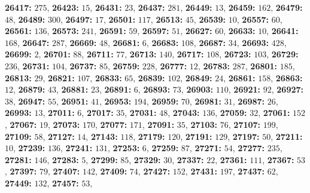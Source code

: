 \textsf{\bfseries 26417:} $275$, \textsf{\bfseries 26423:} $15$, \textsf{\bfseries 26431:} $23$, \textsf{\bfseries 26437:} $281$, \textsf{\bfseries 26449:} $13$, \textsf{\bfseries 26459:} $162$, \textsf{\bfseries 26479:} $48$, \textsf{\bfseries 26489:} $300$, \textsf{\bfseries 26497:} $17$, \textsf{\bfseries 26501:} $117$, \textsf{\bfseries 26513:} $45$, \textsf{\bfseries 26539:} $10$, \textsf{\bfseries 26557:} $60$, \textsf{\bfseries 26561:} $136$, \textsf{\bfseries 26573:} $241$, \textsf{\bfseries 26591:} $59$, \textsf{\bfseries 26597:} $51$, \textsf{\bfseries 26627:} $60$, \textsf{\bfseries 26633:} $10$, \textsf{\bfseries 26641:} $168$, \textsf{\bfseries 26647:} $287$, \textsf{\bfseries 26669:} $48$, \textsf{\bfseries 26681:} $6$, \textsf{\bfseries 26683:} $108$, \textsf{\bfseries 26687:} $34$, \textsf{\bfseries 26693:} $428$, \textsf{\bfseries 26699:} $2$, \textsf{\bfseries 26701:} $88$, \textsf{\bfseries 26711:} $77$, \textsf{\bfseries 26713:} $140$, \textsf{\bfseries 26717:} $108$, \textsf{\bfseries 26723:} $103$, \textsf{\bfseries 26729:} $236$, \textsf{\bfseries 26731:} $104$, \textsf{\bfseries 26737:} $85$, \textsf{\bfseries 26759:} $228$, \textsf{\bfseries 26777:} $12$, \textsf{\bfseries 26783:} $287$, \textsf{\bfseries 26801:} $185$, \textsf{\bfseries 26813:} $29$, \textsf{\bfseries 26821:} $107$, \textsf{\bfseries 26833:} $65$, \textsf{\bfseries 26839:} $102$, \textsf{\bfseries 26849:} $24$, \textsf{\bfseries 26861:} $158$, \textsf{\bfseries 26863:} $12$, \textsf{\bfseries 26879:} $43$, \textsf{\bfseries 26881:} $23$, \textsf{\bfseries 26891:} $6$, \textsf{\bfseries 26893:} $73$, \textsf{\bfseries 26903:} $110$, \textsf{\bfseries 26921:} $92$, \textsf{\bfseries 26927:} $38$, \textsf{\bfseries 26947:} $55$, \textsf{\bfseries 26951:} $41$, \textsf{\bfseries 26953:} $194$, \textsf{\bfseries 26959:} $70$, \textsf{\bfseries 26981:} $31$, \textsf{\bfseries 26987:} $26$, \textsf{\bfseries 26993:} $13$, \textsf{\bfseries 27011:} $6$, \textsf{\bfseries 27017:} $35$, \textsf{\bfseries 27031:} $48$, \textsf{\bfseries 27043:} $136$, \textsf{\bfseries 27059:} $32$, \textsf{\bfseries 27061:} $152$, \textsf{\bfseries 27067:} $19$, \textsf{\bfseries 27073:} $170$, \textsf{\bfseries 27077:} $171$, \textsf{\bfseries 27091:} $35$, \textsf{\bfseries 27103:} $76$, \textsf{\bfseries 27107:} $199$, \textsf{\bfseries 27109:} $58$, \textsf{\bfseries 27127:} $14$, \textsf{\bfseries 27143:} $118$, \textsf{\bfseries 27179:} $120$, \textsf{\bfseries 27191:} $129$, \textsf{\bfseries 27197:} $50$, \textsf{\bfseries 27211:} $10$, \textsf{\bfseries 27239:} $136$, \textsf{\bfseries 27241:} $131$, \textsf{\bfseries 27253:} $6$, \textsf{\bfseries 27259:} $87$, \textsf{\bfseries 27271:} $54$, \textsf{\bfseries 27277:} $235$, \textsf{\bfseries 27281:} $146$, \textsf{\bfseries 27283:} $5$, \textsf{\bfseries 27299:} $85$, \textsf{\bfseries 27329:} $30$, \textsf{\bfseries 27337:} $22$, \textsf{\bfseries 27361:} $111$, \textsf{\bfseries 27367:} $53$, \textsf{\bfseries 27397:} $79$, \textsf{\bfseries 27407:} $142$, \textsf{\bfseries 27409:} $74$, \textsf{\bfseries 27427:} $152$, \textsf{\bfseries 27431:} $197$, \textsf{\bfseries 27437:} $62$, \textsf{\bfseries 27449:} $132$, \textsf{\bfseries 27457:} $53$, 
